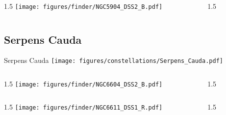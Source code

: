 \documentclass[final]{beamer}
\newlength{\colwidth}
\begin{document}
\begin{frame}[t]{}
  \begin{columns}[T]
    \begin{column}{1.5\colwidth}
      \centering
      \texttt{[image: figures/finder/NGC5904\_DSS2\_B.pdf]}
    \end{column}
    \begin{column}{1.5\colwidth}
      \Large
      
    \end{column}
  \end{columns}
  \vspace{\fill}
\end{frame}

\subsection{Serpens Cauda}

\begin{frame}[t]{\LARGE Serpens Cauda}
  \centering
  \texttt{[image: figures/constellations/Serpens\_Cauda.pdf]}
\end{frame}


\begin{frame}[t]{}
  \begin{columns}[T]
    \begin{column}{1.5\colwidth}
      \centering
      \texttt{[image: figures/finder/NGC6604\_DSS2\_B.pdf]}
    \end{column}
    \begin{column}{1.5\colwidth}
      \Large
      
    \end{column}
  \end{columns}
  \vspace{\fill}
  \begin{columns}[T]
    \begin{column}{1.5\colwidth}
      \centering
      \texttt{[image: figures/finder/NGC6611\_DSS1\_R.pdf]}
    \end{column}
    \begin{column}{1.5\colwidth}
      \Large
      
    \end{column}
  \end{columns}
\end{frame}
\end{document}
